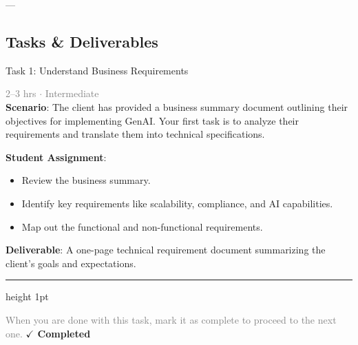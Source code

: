 \documentclass[10pt,a4paper]{article}
\begin{document}
---

\subsection*{Tasks \& Deliverables}

\begin{taskbox}{Task 1: Understand Business Requirements}

    {\small \textcolor{gray}{2--3 hrs $\cdot$ Intermediate}}\\[12pt]

    \textbf{Scenario}: The client has provided a business summary document outlining their objectives for implementing GenAI. Your first task is to analyze their requirements and translate them into technical specifications.  

\textbf{Student Assignment}:  
\begin{itemize}
    \item Review the business summary.  
    \item Identify key requirements like scalability, compliance, and AI capabilities.  
    \item Map out the functional and non-functional requirements.  
\end{itemize}

\textbf{Deliverable}: A one-page technical requirement document summarizing the client’s goals and expectations.\par

    \vspace{16pt}

    \textcolor{cardBorder}{\hrule height 1pt}\vspace{8pt}

    \small \textcolor{gray}{When you are done with this task, mark it as complete to proceed to the next one.} \hfill \textbf{\textcolor{brandDark}{$\checkmark$ Completed}}

\end{taskbox}
\end{document}

